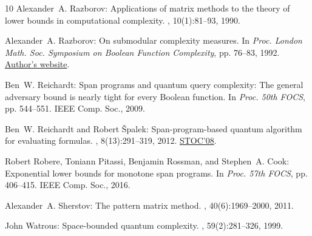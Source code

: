 \documentclass[11pt]{article}
\numberwithin{equation}{section}
\theoremstyle{definition}
\theoremstyle{plain}
\begin{document}
\begin{thebibliography}{10}
{\sc Alexander~A. Razborov}: Applications of matrix methods to the theory of
  lower bounds in computational complexity.
, 10(1):81--93, 1990.
\newblock [\epfmtdoi{10.1007/BF02122698}]

{\sc Alexander~A. Razborov}: On submodular complexity measures.
\newblock In {\em Proc. London Math. Soc. Symposium on Boolean Function
  Complexity}, pp. 76--83, 1992.
\newblock
  \href{https://people.cs.uchicago.edu/~razborov/files/sub.pdf}{Author's
  website}.

{\sc Ben~W. Reichardt}: Span programs and quantum query complexity: {T}he
  general adversary bound is nearly tight for every {B}oolean function.
\newblock In {\em Proc. 50th FOCS}, pp. 544--551. IEEE Comp. Soc., 2009.

{\sc Ben~W. Reichardt and Robert {\v{S}}palek}: Span-program-based quantum
  algorithm for evaluating formulas.
, 8(13):291--319, 2012.
\newblock \prelim \href{https://doi.org/10.1145/1374376.1374394}{STOC'08}.

{\sc Robert Robere, Toniann Pitassi, Benjamin Rossman, and Stephen~A. Cook}:
  Exponential lower bounds for monotone span programs.
\newblock In {\em Proc. 57th FOCS}, pp. 406--415. IEEE Comp. Soc., 2016.

{\sc Alexander~A. Sherstov}: The pattern matrix method.
, 40(6):1969--2000, 2011.

{\sc John Watrous}: Space-bounded quantum complexity.
, 59(2):281--326, 1999.

\end{thebibliography}
\end{document}
